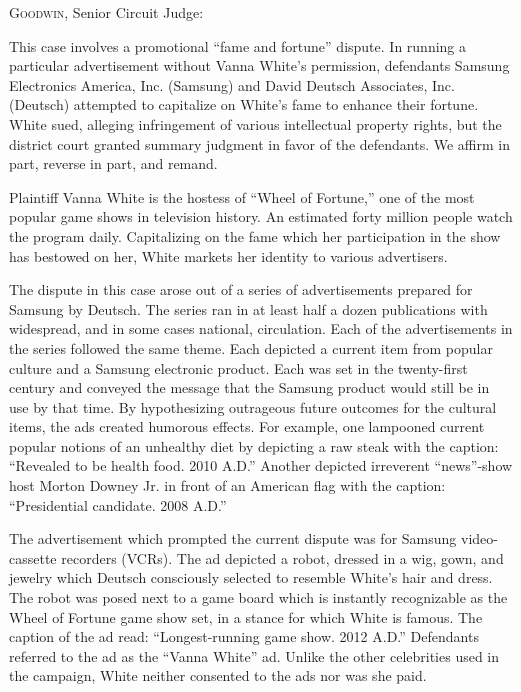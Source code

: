 

\opinion \textsc{Goodwin}, Senior Circuit Judge:

This case involves a promotional ``fame and fortune'' dispute. In running a
particular advertisement without Vanna White's permission, defendants Samsung
Electronics America, Inc. (Samsung) and David Deutsch Associates, Inc.
(Deutsch) attempted to capitalize on White's fame to enhance their fortune.
White sued, alleging infringement of various intellectual property rights, but
the district court granted summary judgment in favor of the defendants. We
affirm in part, reverse in part, and remand.

Plaintiff Vanna White is the hostess of ``Wheel of Fortune,'' one of the most
popular game shows in television history. An estimated forty million people
watch the program daily. Capitalizing on the fame which her participation in
the show has bestowed on her, White markets her identity to various
advertisers.

The dispute in this case arose out of a series of advertisements prepared for
Samsung by Deutsch. The series ran in at least half a dozen publications with
widespread, and in some cases national, circulation. Each of the advertisements
in the series followed the same theme. Each depicted a current item from
popular culture and a Samsung electronic product. Each was set in the
twenty-first century and conveyed the message that the Samsung product would
still be in use by that time. By hypothesizing outrageous future outcomes for
the cultural items, the ads created humorous effects. For example, one
lampooned current popular notions of an unhealthy diet by depicting a raw steak
with the caption: ``Revealed to be health food. 2010 A.D.'' Another depicted
irreverent ``news''-show host Morton Downey Jr. in front of an American flag
with the caption: ``Presidential candidate. 2008 A.D.''


The advertisement which prompted the current dispute was for Samsung
video-cassette recorders (VCRs). The ad depicted a robot, dressed in a wig,
gown, and jewelry which Deutsch consciously selected to resemble White's hair
and dress. The robot was posed next to a game board which is instantly
recognizable as the Wheel of Fortune game show set, in a stance for which White
is famous. The caption of the ad read: ``Longest-running game show. 2012 A.D.''
Defendants referred to the ad as the ``Vanna White'' ad. Unlike the other
celebrities used in the campaign, White neither consented to the ads nor was
she paid.

